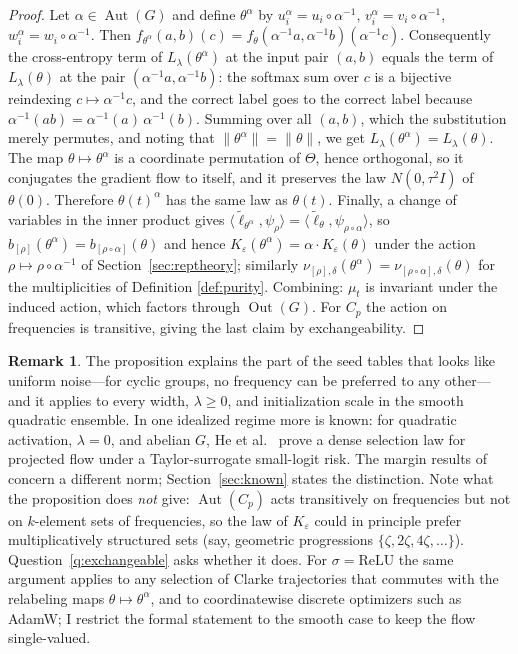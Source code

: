 \documentclass[11pt]{amsart}
\theoremstyle{plain}
\theoremstyle{definition}
\newtheorem{remark}[theorem]{Remark}
\DeclareMathOperator{\Out}{Out}
\DeclareMathOperator{\Aut}{Aut}
\begin{document}
\begin{proof}
Let $\alpha \in \Aut(G)$ and define $\theta^\alpha$ by $u_i^\alpha = u_i \circ \alpha^{-1}$, $v_i^\alpha = v_i \circ \alpha^{-1}$, $w_i^\alpha = w_i \circ \alpha^{-1}$. Then $f_{\theta^\alpha}(a,b)(c) = f_\theta(\alpha^{-1}a, \alpha^{-1}b)(\alpha^{-1}c)$. Consequently the cross-entropy term of $L_\lambda(\theta^\alpha)$ at the input pair $(a,b)$ equals the term of $L_\lambda(\theta)$ at the pair $(\alpha^{-1}a, \alpha^{-1}b)$: the softmax sum over $c$ is a bijective reindexing $c \mapsto \alpha^{-1}c$, and the correct label goes to the correct label because $\alpha^{-1}(ab) = \alpha^{-1}(a)\,\alpha^{-1}(b)$. Summing over all $(a,b)$, which the substitution merely permutes, and noting that $\|\theta^\alpha\| = \|\theta\|$, we get $L_\lambda(\theta^\alpha) = L_\lambda(\theta)$. The map $\theta \mapsto \theta^\alpha$ is a coordinate permutation of $\Theta$, hence orthogonal, so it conjugates the gradient flow to itself, and it preserves the law $N(0,\tau^2 I)$ of $\theta(0)$. Therefore $\theta(t)^\alpha$ has the same law as $\theta(t)$. Finally, a change of variables in the inner product gives $\langle \tilde\ell_{\theta^\alpha}, \psi_\rho \rangle = \langle \tilde\ell_\theta, \psi_{\rho \circ \alpha} \rangle$, so $b_{[\rho]}(\theta^\alpha) = b_{[\rho \circ \alpha]}(\theta)$ and hence $K_\varepsilon(\theta^\alpha) = \alpha \cdot K_\varepsilon(\theta)$ under the action $\rho \mapsto \rho \circ \alpha^{-1}$ of Section~\ref{sec:reptheory}; similarly $\nu_{[\rho],\delta}(\theta^\alpha) = \nu_{[\rho \circ \alpha],\delta}(\theta)$ for the multiplicities of Definition \ref{def:purity}. Combining: $\mu_t$ is invariant under the induced action, which factors through $\Out(G)$. For $C_p$ the action on frequencies is transitive, giving the last claim by exchangeability.
\end{proof}

\begin{remark}
The proposition explains the part of the seed tables that looks like uniform noise---for cyclic groups, no frequency can be preferred to any other---and it applies to every width, $\lambda\ge0$, and initialization scale in the smooth quadratic ensemble. In one idealized regime more is known: for quadratic activation, $\lambda=0$, and abelian $G$, He et al.\ \cite{he2026spectral} prove a dense selection law for projected flow under a Taylor-surrogate small-logit risk. The margin results of \cite{morwani2024,wei2019} concern a different norm; Section~\ref{sec:known} states the distinction. Note what the proposition does \emph{not} give: $\Aut(C_p)$ acts transitively on frequencies but not on $k$-element sets of frequencies, so the law of $K_\varepsilon$ could in principle prefer multiplicatively structured sets (say, geometric progressions $\{\zeta, 2\zeta, 4\zeta, \dots\}$). Question~\ref{q:exchangeable} asks whether it does. For $\sigma = \mathrm{ReLU}$ the same argument applies to any selection of Clarke trajectories that commutes with the relabeling maps $\theta \mapsto \theta^\alpha$, and to coordinatewise discrete optimizers such as AdamW; I restrict the formal statement to the smooth case to keep the flow single-valued.
\end{remark}
\end{document}
